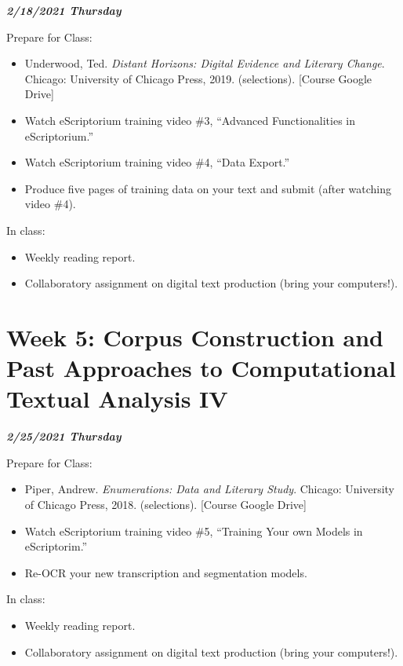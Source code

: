 \documentclass[
]{book}
\providecommand{\tightlist}{%
  \setlength{\itemsep}{0pt}\setlength{\parskip}{0pt}}
\begin{document}
\textbf{\emph{2/18/2021 Thursday}}

Prepare for Class:

\begin{itemize}
\tightlist
\item
  Underwood, Ted. \emph{Distant Horizons: Digital Evidence and Literary Change}. Chicago: University of Chicago Press, 2019. (selections). {[}Course Google Drive{]}
\item
  Watch eScriptorium training video \#3, ``Advanced Functionalities in eScriptorium.''
\item
  Watch eScriptorium training video \#4, ``Data Export.''
\item
  Produce five pages of training data on your text and submit (after watching video \#4).
\end{itemize}

In class:

\begin{itemize}
\tightlist
\item
  Weekly reading report.
\item
  Collaboratory assignment on digital text production (bring your computers!).
\end{itemize}

\hypertarget{week-5-corpus-construction-and-past-approaches-to-computational-textual-analysis-iv-1}{%
\chapter{Week 5: Corpus Construction and Past Approaches to Computational Textual Analysis IV}\label{week-5-corpus-construction-and-past-approaches-to-computational-textual-analysis-iv-1}}

\textbf{\emph{2/25/2021 Thursday}}

Prepare for Class:

\begin{itemize}
\tightlist
\item
  Piper, Andrew. \emph{Enumerations: Data and Literary Study}. Chicago: University of Chicago Press, 2018. (selections). {[}Course Google Drive{]}
\item
  Watch eScriptorium training video \#5, ``Training Your own Models in eScriptorim.''
\item
  Re-OCR your new transcription and segmentation models.
\end{itemize}

In class:

\begin{itemize}
\tightlist
\item
  Weekly reading report.
\item
  Collaboratory assignment on digital text production (bring your computers!).
\end{itemize}
\end{document}
